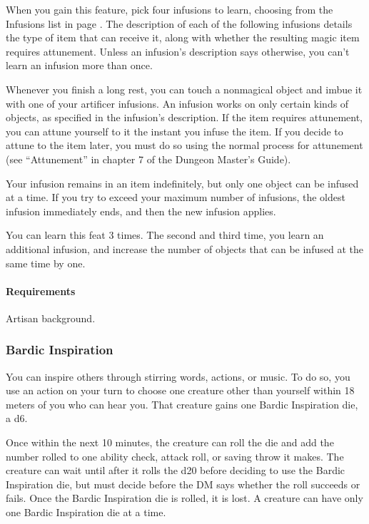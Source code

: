     When you gain this feature, pick four infusions to learn, choosing from the Infusions list in page \pageref{ssec::infusions}.
    The description of each of the following infusions details the type of item that can receive it, along with whether the resulting magic item requires attunement.
    Unless an infusion's description says otherwise, you can't learn an infusion more than once.

    Whenever you finish a long rest, you can touch a nonmagical object and imbue it with one of your artificer infusions.
    An infusion works on only certain kinds of objects, as specified in the infusion's description.
    If the item requires attunement, you can attune yourself to it the instant you infuse the item.
    If you decide to attune to the item later, you must do so using the normal process for attunement (see ``Attunement'' in chapter 7 of the Dungeon Master's Guide).

    Your infusion remains in an item indefinitely, but only one object can be infused at a time.
    If you try to exceed your maximum number of infusions, the oldest infusion immediately ends, and then the new infusion applies.

    You can learn this feat 3 times.
    The second and third time, you learn an additional infusion, and increase the number of objects that can be infused at the same time by one.

    \paragraph{Requirements} Artisan background.
\subsubsection{Bardic Inspiration} \label{feat::bardicinspiration}
    You can inspire others through stirring words, actions, or music.
    To do so, you use an action on your turn to choose one creature other than yourself within 18 meters of you who can hear you.
    That creature gains one Bardic Inspiration die, a d6.

    Once within the next 10 minutes, the creature can roll the die and add the number rolled to one ability check, attack roll, or saving throw it makes.
    The creature can wait until after it rolls the d20 before deciding to use the Bardic Inspiration die, but must decide before the DM says whether the roll succeeds or fails.
    Once the Bardic Inspiration die is rolled, it is lost.
    A creature can have only one Bardic Inspiration die at a time.

